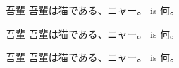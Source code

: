 \documentclass{article}
\begin{document}
\begin{CJK}{UTF8}{ipxm}
\newlength{\zw}\settowidth{\zw}{一}


吾輩%
\DirBoxTate\vbox{\sloppy{}\zw{}\zw
吾輩は猫である、ニャー。}
is 何。

吾輩%
\DirBoxRotR\vbox{\sloppy{}\zw{}\zw
吾輩は猫である、ニャー。}
is 何。

吾輩%
\DirBoxRotL\vbox{\sloppy{}\zw{}\zw
吾輩は猫である、ニャー。}
is 何。

\end{CJK}
\end{document}
